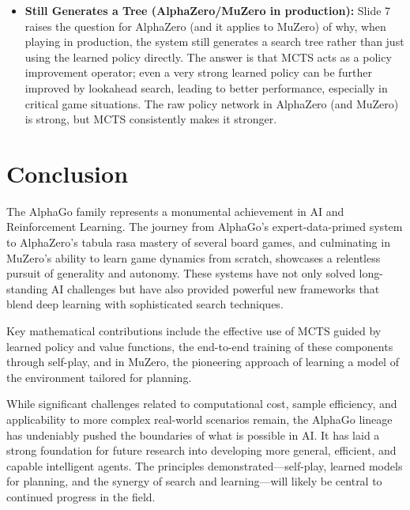 \documentclass[11pt,a4paper]{article}
\begin{document}
\begin{itemize}
    \item \textbf{Still Generates a Tree (AlphaZero/MuZero in production):} Slide 7 raises the question for AlphaZero (and it applies to MuZero) of why, when playing in production, the system still generates a search tree rather than just using the learned policy directly. The answer is that MCTS acts as a policy improvement operator; even a very strong learned policy can be further improved by lookahead search, leading to better performance, especially in critical game situations. The raw policy network in AlphaZero (and MuZero) is strong, but MCTS consistently makes it stronger.
\end{itemize}

\section{Conclusion}
The AlphaGo family represents a monumental achievement in AI and Reinforcement Learning. The journey from AlphaGo's expert-data-primed system to AlphaZero's tabula rasa mastery of several board games, and culminating in MuZero's ability to learn game dynamics from scratch, showcases a relentless pursuit of generality and autonomy. These systems have not only solved long-standing AI challenges but have also provided powerful new frameworks that blend deep learning with sophisticated search techniques.

Key mathematical contributions include the effective use of MCTS guided by learned policy and value functions, the end-to-end training of these components through self-play, and in MuZero, the pioneering approach of learning a model of the environment tailored for planning.

While significant challenges related to computational cost, sample efficiency, and applicability to more complex real-world scenarios remain, the AlphaGo lineage has undeniably pushed the boundaries of what is possible in AI. It has laid a strong foundation for future research into developing more general, efficient, and capable intelligent agents. The principles demonstrated—self-play, learned models for planning, and the synergy of search and learning—will likely be central to continued progress in the field.

\clearpage

\nocite{*}
\printbibliography%
\end{document}
